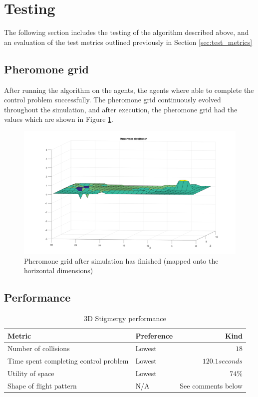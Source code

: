 \section{Testing}
\label{chap:stigmergy_test}

The following section includes the testing of the algorithm described above, and an evaluation of the test metrics outlined previously in Section \ref{sec:test_metrics}
\subsection{Pheromone grid}

After running the algorithm on the agents, the agents where able to complete the control problem successfully. The pheromone grid continuously evolved throughout the simulation, and after execution, the pheromone grid had the values which are shown in Figure \ref{fig:phero_post}.

\begin{figure}[H]
	\centering
	\includegraphics[width=1\columnwidth]{figures/STIG_pheromones}
  	\caption{\label{fig:phero_post}Pheromone grid after simulation has finished (mapped onto the horizontal dimensions)}
\end{figure}


\subsection{Performance}

\begin{table}[H]
\centering
\begin{tabularx}{1\textwidth}{l@{ }Xr}
\toprule
\textbf{Metric} &\textbf{Preference} & \textbf{Kind} \\ \midrule
Number of collisions  & Lowest & $18$  \\
Time spent completing control problem & Lowest & $120.1 seconds$  \\
Utility of space & Lowest & $74\%$  \\
Shape of flight pattern  & N/A & See comments below \\
\bottomrule
\end{tabularx}
\caption{3D Stigmergy performance}
\label{tab:stig_metrics}
\end{table}

